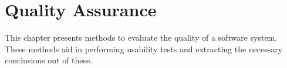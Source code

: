\chapter{Quality Assurance}
This chapter presents methods to evaluate the quality of a software system. These methods aid in performing usability tests and extracting the necessary conclusions out of these.


%


